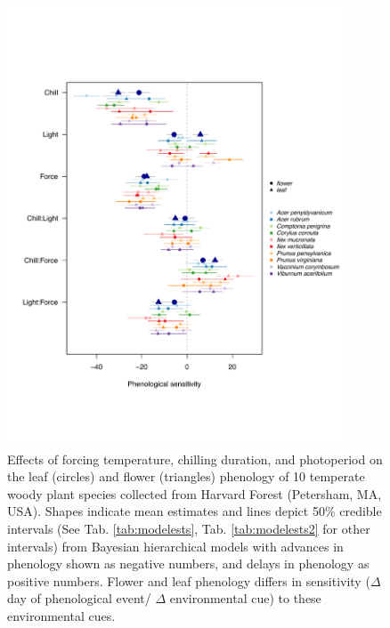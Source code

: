\documentclass[11pt]{article}\usepackage[]{graphicx}\usepackage[]{color}
\begin{document}
\begin{figure}[h!]
    \centering
         \includegraphics[width=0.9\textwidth]{..//Plots/Flobuds_manuscript_figs/budburstvsflowering.pdf}
         \caption{Effects of forcing temperature, chilling duration, and photoperiod on the leaf (circles) and flower (triangles) phenology of 10 temperate woody plant species collected from Harvard Forest (Petersham, MA, USA). Shapes indicate mean estimates and lines depict 50\% credible intervals (See Tab. \ref{tab:modelests}, Tab. \ref{tab:modelests2} for other intervals) from Bayesian hierarchical models with advances in phenology shown as negative numbers, and delays in phenology as positive numbers. Flower and leaf phenology differs in sensitivity ($\Delta$ day of phenological event/ $\Delta$ environmental cue) to these environmental cues.}
    \label{fig:model}
\end{figure}
\end{document}
